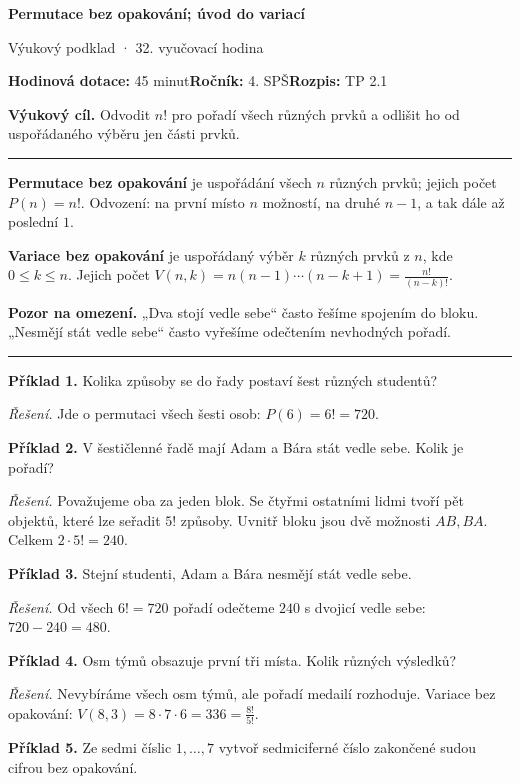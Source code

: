 \documentclass[11pt,a4paper]{article}
\newcommand{\sect}[1]{\par\vspace{2mm}{\Large\sffamily\bfseries\color{deep} #1}\par\vspace{-0.5mm}\noindent\color{teal}\rule{\linewidth}{0.7pt}\color{black}\vspace{1mm}}
\begin{document}
{\Huge\sffamily\bfseries\color{deep} Permutace bez opakování; úvod do variací}\par
{\sffamily\large\color{teal} Výukový podklad · 32. vyučovací hodina}\par
\textbf{Hodinová dotace:} 45 minut\quad \textbf{Ročník:} 4. SPŠ\quad \textbf{Rozpis:} TP 2.1\par
\begin{tcolorbox}[theobox]\textbf{Výukový cíl.} Odvodit \(n!\) pro pořadí všech různých prvků a odlišit ho od uspořádaného výběru jen části prvků.\end{tcolorbox}
\sect{Teorie a vysvětlení}
\textbf{Permutace bez opakování} je uspořádání všech \(n\) různých prvků; jejich počet \(P(n)=n!\). Odvození: na první místo \(n\) možností, na druhé \(n-1\), a tak dále až poslední \(1\).\par
\textbf{Variace bez opakování} je uspořádaný výběr \(k\) různých prvků z \(n\), kde \(0\le k\le n\). Jejich počet \(V(n,k)=n(n-1)\cdots(n-k+1)=\frac{n!}{(n-k)!}\).\par
\textbf{Pozor na omezení.} „Dva stojí vedle sebe“ často řešíme spojením do bloku. „Nesmějí stát vedle sebe“ často vyřešíme odečtením nevhodných pořadí.
\sect{Řešené příklady}
\textbf{Příklad 1.} Kolika způsoby se do řady postaví šest různých studentů?\par
\textit{Řešení.} Jde o permutaci všech šesti osob: \(P(6)=6!=720\).\par\smallskip
\textbf{Příklad 2.} V šestičlenné řadě mají Adam a Bára stát vedle sebe. Kolik je pořadí?\par
\textit{Řešení.} Považujeme oba za jeden blok. Se čtyřmi ostatními lidmi tvoří pět objektů, které lze seřadit \(5!\) způsoby. Uvnitř bloku jsou dvě možnosti \(AB,BA\). Celkem \(2\cdot5!=240\).\par\smallskip
\textbf{Příklad 3.} Stejní studenti, Adam a Bára nesmějí stát vedle sebe.\par
\textit{Řešení.} Od všech \(6!=720\) pořadí odečteme \(240\) s dvojicí vedle sebe: \(720-240=480\).\par\smallskip
\textbf{Příklad 4.} Osm týmů obsazuje první tři místa. Kolik různých výsledků?\par
\textit{Řešení.} Nevybíráme všech osm týmů, ale pořadí medailí rozhoduje. Variace bez opakování: \(V(8,3)=8\cdot7\cdot6=336=\frac{8!}{5!}\).\par\smallskip
\textbf{Příklad 5.} Ze sedmi číslic \(1,\ldots,7\) vytvoř sedmiciferné číslo zakončené sudou cifrou bez opakování.\par
\end{document}
